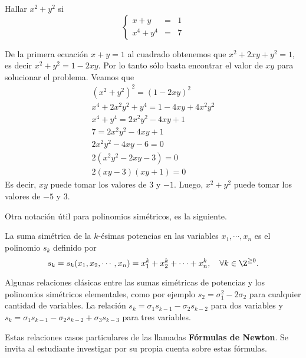 \begin{example}
    Hallar $x^2 + y^2$ si
    \[
        \left\{
        \begin{array}{rcl}
            x + y & =& 1\\
            x^4 + y^4 & =& 7
        \end{array}
        \right.
    \]
\end{example}
\begin{solution}
    De la primera ecuación $x + y = 1$ al cuadrado obtenemos que $x^2 + 2xy + y^2 = 1$, es decir $x^2 + y^2 = 1 - 2xy$.
    Por lo tanto sólo basta encontrar el valor de $xy$ para solucionar el problema.
    Veamos que
    \begin{gather*}
        (x^2 + y^2)^2 = (1 - 2xy)^2 \\
        x^4 + 2x^2 y^2 + y^4 = 1 - 4xy + 4x^2 y^2\\
        x^4 + y^4 = 2x^2 y^2 - 4xy + 1\\
        7 = 2x^2 y^2 - 4xy + 1\\
        2x^2 y^2 - 4xy - 6 = 0\\
        2(x^2 y^2 - 2xy - 3) = 0\\
        2(xy - 3)(xy + 1) = 0
    \end{gather*}
    Es decir, $xy$ puede tomar los valores de $3$ y $-1$.
    Luego, $x^2 + y^2$ puede tomar los valores de $\boxed{-5}$ y $\boxed{3}$.
\end{solution}

Otra notación útil para polinomios simétricos, es la siguiente.

\begin{section-definition}
    La suma simétrica de la $k$-ésimas potencias en las variables $x_1, \cdots, x_n$ es el polinomio $s_k$ definido por
    \[s_k = s_k(x_1, x_2, \cdots, x_n) = x_1^k + x_2^k + \cdots + x_n^k, \quad \forall k \in \Z^{\geq 0}.\]
\end{section-definition}

Algunas relaciones clásicas entre las sumas simétricas de potencias y los polinomios simétricos elementales, como por ejemplo $\boxed{s_2 = \sigma_1^2 - 2\sigma_2}$ para cualquier cantidad de variables.
La relación $\boxed{s_k = \sigma_1 s_{k - 1} - \sigma_2 s_{k - 2}}$ para dos variables y $\boxed{s_k = \sigma_1 s_{k - 1} - \sigma_2 s_{k - 2} + \sigma_3 s_{k - 3}}$ para tres variables.

Estas relaciones casos particulares de las llamadas \textbf{Fórmulas de Newton}.
Se invita al estudiante investigar por su propia cuenta sobre estas fórmulas.

